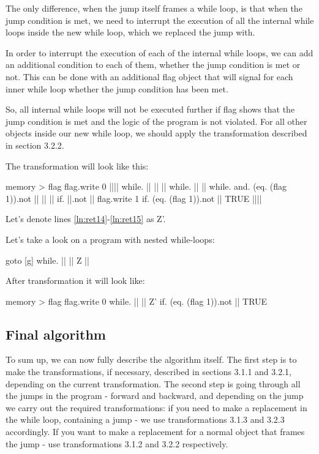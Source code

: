 \documentclass[sigplan,review,11pt,nonacm,natbib=false]{acmart}
\begin{document}
The only difference, when the jump itself frames a while loop, is that when the jump condition is met, we need to interrupt the execution of all the internal while loops inside the new while loop, which we replaced the jump with.

In order to interrupt the execution of each of the internal while loops, we can add an additional condition to each of them, whether the jump condition is met or not. This can be done with an additional flag object that will signal for each inner while loop whether the jump condition has been met.

So, all internal while loops will not be executed further if flag shows that the jump condition is met and the logic of the program is not violated. For all other objects inside our new while loop, we should apply the transformation described in section 3.2.2.

The transformation will look like this:

\begin{ffcode}
memory > flag
flag.write 0
|||$\label{ln:ret14}$|
  while.
    ||
    ||
      ||
      while.
        ||
        ||
          while.
            and.
              (eq. (flag 1)).not
              ||
            ||
              ||
              if.
                ||.not
                ||
                flag.write 1
              if.
                (eq. (flag 1)).not
                ||
                TRUE
      |||$\label{ln:ret15}$|
        
\end{ffcode}

Let's denote lines \ref{ln:ret14}-\ref{ln:ret15} as Z'.


Let's take a look on a program with nested while-loops:
\begin{ffcode}
goto
  [g]
    while.
      ||
      ||
        Z
        ||
\end{ffcode}

After transformation it will look like:
\begin{ffcode}
memory > flag
flag.write 0
while.
  ||
  ||
    Z'
    if.
      (eq. (flag 1)).not
      ||
      TRUE
\end{ffcode}



\subsection{Final algorithm}
To sum up, we can now fully describe the algorithm itself. The first step is to make the transformations, if necessary, described in sections 3.1.1 and 3.2.1, depending on the current transformation. The second step is going through all the jumps in the program - forward and backward, and depending on the jump we carry out the required transformations: if you need to make a replacement in the while loop, containing a jump - we use transformations 3.1.3 and 3.2.3 accordingly. If you want to make a replacement for a normal object that frames the jump - use transformations 3.1.2 and 3.2.2 respectively.
\end{document}

